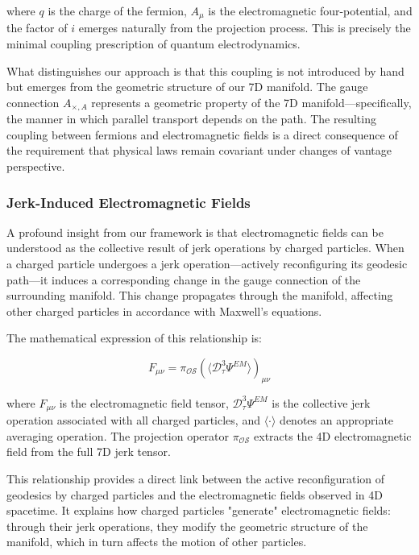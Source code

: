 \documentclass{article}
\begin{document}
where $q$ is the charge of the fermion, $A_\mu$ is the electromagnetic four-potential, and the factor of $i$ emerges naturally from the projection process. This is precisely the minimal coupling prescription of quantum electrodynamics.

What distinguishes our approach is that this coupling is not introduced by hand but emerges from the geometric structure of our 7D manifold. The gauge connection $A_{\times, A}$ represents a geometric property of the 7D manifold—specifically, the manner in which parallel transport depends on the path. The resulting coupling between fermions and electromagnetic fields is a direct consequence of the requirement that physical laws remain covariant under changes of vantage perspective.

\subsubsection{Jerk-Induced Electromagnetic Fields}

A profound insight from our framework is that electromagnetic fields can be understood as the collective result of jerk operations by charged particles. When a charged particle undergoes a jerk operation—actively reconfiguring its geodesic path—it induces a corresponding change in the gauge connection of the surrounding manifold. This change propagates through the manifold, affecting other charged particles in accordance with Maxwell's equations.

The mathematical expression of this relationship is:

\begin{equation}
F_{\mu\nu} = \pi_{\mathcal{OS}}(\langle \mathcal{D}_\tau^3 \Psi^{EM} \rangle)_{\mu\nu}
\end{equation}

where $F_{\mu\nu}$ is the electromagnetic field tensor, $\mathcal{D}_\tau^3 \Psi^{EM}$ is the collective jerk operation associated with all charged particles, and $\langle \cdot \rangle$ denotes an appropriate averaging operation. The projection operator $\pi_{\mathcal{OS}}$ extracts the 4D electromagnetic field from the full 7D jerk tensor.

This relationship provides a direct link between the active reconfiguration of geodesics by charged particles and the electromagnetic fields observed in 4D spacetime. It explains how charged particles "generate" electromagnetic fields: through their jerk operations, they modify the geometric structure of the manifold, which in turn affects the motion of other particles.
\end{document}
